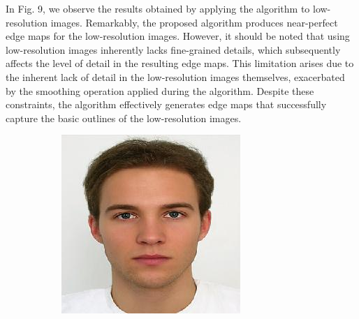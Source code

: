 \documentclass{70_styles/svproc}
\begin{document}
In Fig. 9, we observe the results obtained by applying the algorithm to low-resolution images. Remarkably, the proposed algorithm produces near-perfect edge maps for the low-resolution images. However, it should be noted that using low-resolution images inherently lacks fine-grained details, which subsequently affects the level of detail in the resulting edge maps. This limitation arises due to the inherent lack of detail in the low-resolution images themselves, exacerbated by the smoothing operation applied during the algorithm. Despite these constraints, the algorithm effectively generates edge maps that successfully capture the basic outlines of the low-resolution images.

\begin{figure}
    \begin{minipage}[b]{0.47\textwidth}
        \centering
     \begin{subfigure}[H]{0.4\textwidth}
         \centering
         \includegraphics[width=\textwidth]{70_figures/1 (79).jpg}
     \end{subfigure}
     \begin{subfigure}[H]{0.4\textwidth}
         \centering

\end{subfigure}
\end{minipage}
\end{figure}
\end{document}
